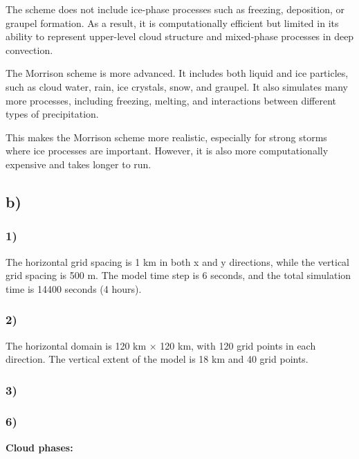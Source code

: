 \documentclass{article}
\begin{document}
The scheme does not include ice-phase processes such as freezing, deposition, or graupel formation. As a result, it is computationally efficient but limited in its ability to represent upper-level cloud structure and mixed-phase processes in deep convection.

The Morrison scheme is more advanced. It includes both liquid and ice particles, such as cloud water, rain, ice crystals, snow, and graupel. It also simulates many more processes, including freezing, melting, and interactions between different types of precipitation.

This makes the Morrison scheme more realistic, especially for strong storms where ice processes are important. However, it is also more computationally expensive and takes longer to run.

\subsection*{b)}

\subsubsection*{1)}

The horizontal grid spacing is 1 km in both x and y directions, while the vertical grid spacing is 500 m. The model time step is 6 seconds, and the total simulation time is 14400 seconds (4 hours).

\subsubsection*{2)}

The horizontal domain is 120 km × 120 km, with 120 grid points in each direction. The vertical extent of the model is 18 km and 40 grid points.

\subsubsection*{3)}

\subsubsection*{6)}
\textbf{Cloud phases:}
\end{document}

